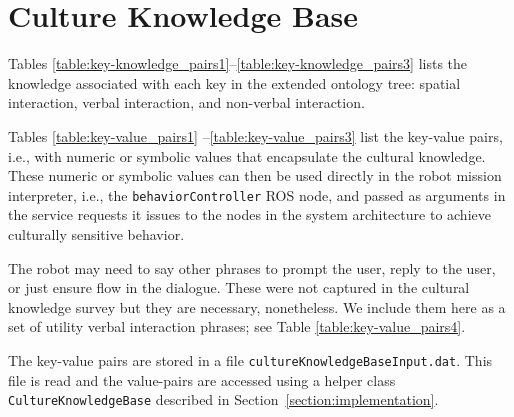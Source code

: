 \documentclass{CSSRforAfrica}
\begin{document}
\section{Culture Knowledge Base}
\label{section:knowledge_base}

Tables \ref{table:key-knowledge_pairs1}--\ref{table:key-knowledge_pairs3}  lists the knowledge associated with each key in the extended ontology tree: spatial interaction, verbal interaction, and non-verbal interaction.

Tables \ref{table:key-value_pairs1} --\ref{table:key-value_pairs3} list the key-value pairs, i.e., with numeric or symbolic values that encapsulate the cultural knowledge.  These numeric or symbolic values can then be used directly in the robot mission interpreter, i.e., the {\small \tt behaviorController} ROS node, and passed as arguments in the service requests it issues to the nodes in the system architecture to achieve culturally sensitive behavior.

The robot may need to say other phrases to prompt the user, reply to the user, or just ensure flow in the dialogue. These were not captured in the cultural knowledge survey but they are necessary, nonetheless.  We include them here as  a set of utility verbal interaction phrases; see Table \ref{table:key-value_pairs4}.

The key-value pairs are stored in a file {\tt \small cultureKnowledgeBaseInput.dat}. This file is read and the value-pairs are accessed using a helper class {\tt \small CultureKnowledgeBase} described in Section~\ref{section:implementation}.  
\end{document}
